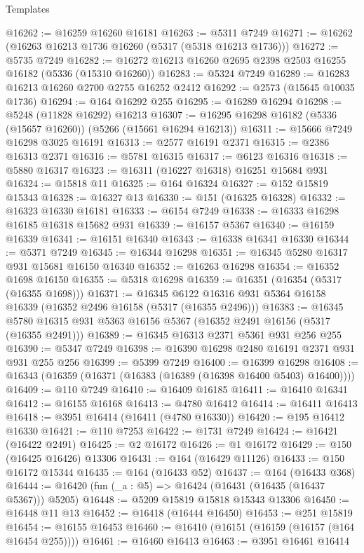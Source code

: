\begin{lexlean}{Templates}
\begin{coremodule}
@16262 := @16259 @16260 @16181
@16263 := @5311 @7249
@16271 := @16262 (@16263 @16213 @1736 @16260 (@5317 (@5318 @16213 @1736)))
@16272 := @5735 @7249
@16282 := @16272 @16213 @16260 @2695 @2398 @2503 @16255 @16182 (@5336 (@15310 @16260))
@16283 := @5324 @7249
@16289 := @16283 @16213 @16260 @2700 @2755 @16252 @2412
@16292 := @2573 (@15645 @10035 @1736)
@16294 := @164 @16292 @255
@16295 := @16289 @16294
@16298 := @5248 (@11828 @16292) @16213
@16307 := @16295 @16298 @16182 (@5336 (@15657 @16260)) (@5266 (@15661 @16294 @16213))
@16311 := @15666 @7249 @16298 @3025 @16191
@16313 := @2577 @16191 @2371
@16315 := @2386 @16313 @2371
@16316 := @5781 @16315
@16317 := @6123 @16316
@16318 := @5880 @16317
@16323 := @16311 (@16227 @16318) @16251 @15684 @931
@16324 := @15818 @11
@16325 := @164 @16324
@16327 := @152 @15819 @15343
@16328 := @16327 @13
@16330 := @151 (@16325 @16328)
@16332 := @16323 @16330 @16181
@16333 := @6154 @7249
@16338 := @16333 @16298 @16185 @16318 @15682 @931
@16339 := @16157 @5367
@16340 := @16159 @16339
@16341 := @16151 @16340
@16343 := @16338 @16341 @16330
@16344 := @5371 @7249
@16345 := @16344 @16298
@16351 := @16345 @5280 @16317 @931 @15681 @16150 @16340
@16352 := @16263 @16298
@16354 := @16352 @1698 @16150
@16355 := @5318 @16298
@16359 := @16351 (@16354 (@5317 (@16355 @1698)))
@16371 := @16345 @6122 @16316 @931 @5364 @16158 @16339 (@16352 @2496 @16158 (@5317 (@16355 @2496)))
@16383 := @16345 @5780 @16315 @931 @5363 @16156 @5367 (@16352 @2491 @16156 (@5317 (@16355 @2491)))
@16389 := @16345 @16313 @2371 @5361 @931 @256 @255
@16390 := @5347 @7249
@16398 := @16390 @16298 @2480 @16191 @2371 @931 @931 @255 @256
@16399 := @5399 @7249
@16400 := @16399 @16298
@16408 := @16343 (@16359 (@16371 (@16383 (@16389 (@16398 @16400 @5403) @16400))))
@16409 := @110 @7249
@16410 := @16409 @16185
@16411 := @16410 @16341
@16412 := @16155 @16168
@16413 := @4780 @16412
@16414 := @16411 @16413
@16418 := @3951 @16414 (@16411 (@4780 @16330))
@16420 := @195 @16412 @16330
@16421 := @110 @7253
@16422 := @1731 @7249
@16424 := @16421 (@16422 @2491)
@16425 := @2 @16172
@16426 := @1 @16172
@16429 := @150 (@16425 @16426) @13306
@16431 := @164 (@16429 @11126)
@16433 := @150 @16172 @15344
@16435 := @164 (@16433 @52)
@16437 := @164 (@16433 @368)
@16444 := @16420 (fun (_a : @5) => @16424 (@16431 (@16435 (@16437 @5367))) @5205)
@16448 := @5209 @15819 @15818 @15343 @13306
@16450 := @16448 @11 @13
@16452 := @16418 (@16444 @16450)
@16453 := @251 @15819
@16454 := @16155 @16453
@16460 := @16410 (@16151 (@16159 (@16157 (@164 @16454 @255))))
@16461 := @16460 @16413
@16463 := @3951 @16461 @16414

\end{coremodule}
\end{lexlean}
